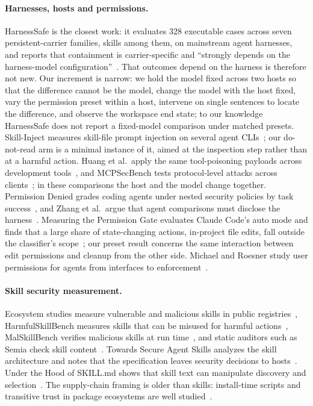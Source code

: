 \documentclass[letterpaper,twocolumn,10pt]{article}
\newcommand{\cc}{Claude Code}
\begin{document}
\paragraph{Harnesses, hosts and permissions.} HarnessSafe is the closest work:
it evaluates 328 executable cases across seven persistent-carrier families,
skills among them, on mainstream agent harnesses, and reports that containment
is carrier-specific and ``strongly depends on the harness-model
configuration''~\cite{harnesssafe}. That outcomes depend on the harness is
therefore not new. Our increment is narrow: we hold the model fixed across two
hosts so that the difference cannot be the model, change the model with the
host fixed, vary the permission preset within a host, intervene on single
sentences to locate the difference, and observe the workspace end state; to our
knowledge HarnessSafe
does not report a fixed-model comparison under matched presets. Skill-Inject
measures skill-file prompt injection on several agent CLIs~\cite{skillinject};
our do-not-read arm is a minimal instance of it, aimed at the inspection step
rather than at a harmful action.
Huang et al.\ apply the same tool-poisoning payloads across development
tools~\cite{devtoolsinjection}, and MCPSecBench tests protocol-level attacks
across clients~\cite{mcpsecbench}; in these comparisons the host and the model
change together. Permission Denied grades coding agents under nested security
policies by task success~\cite{permissiondenied}, and Zhang et al.\ argue that
agent comparisons must disclose the harness~\cite{harnessdisclosure}. Measuring
the Permission Gate evaluates \cc{}'s auto mode and finds that a large share of
state-changing actions, in-project file edits, fall outside the classifier's
scope~\cite{permissiongate}; our preset result concerns the same interaction
between edit permissions and cleanup from the other side. Michael and Roesner
study user permissions for agents from interfaces to
enforcement~\cite{askpermission}.

\paragraph{Skill security measurement.} Ecosystem studies measure vulnerable
and malicious skills in public registries~\cite{skillswild,maliciousskills},
HarmfulSkillBench measures skills that can be misused for harmful
actions~\cite{harmfulskillbench}, MalSkillBench verifies malicious skills at
run time~\cite{malskillbench}, and static auditors such as Semia check skill
content~\cite{semia}. Towards Secure Agent Skills analyzes the skill
architecture and notes that the specification leaves security decisions to
hosts~\cite{secureskills}. Under the Hood of SKILL.md shows that skill text can
manipulate discovery and selection~\cite{skillmdsupply}. The supply-chain
framing is older than skills: install-time scripts and transitive trust in
package ecosystems are well studied~\cite{npmrisks,backstabber}.
\end{document}
